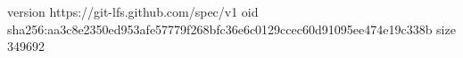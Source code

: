 version https://git-lfs.github.com/spec/v1
oid sha256:aa3c8e2350ed953afe57779f268bfc36e6c0129ccec60d91095ee474e19c338b
size 349692
